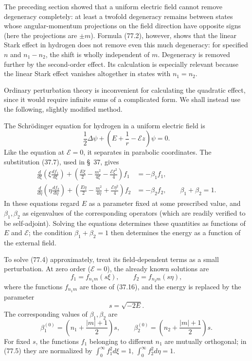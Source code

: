 The preceding section showed that a uniform electric field cannot remove degeneracy completely: at least a twofold degeneracy remains between states whose angular-momentum projections on the field direction have opposite signs (here the projections are $\pm m$). Formula (77.2), however, shows that the linear Stark effect in hydrogen does not remove even this much degeneracy: for specified $n$ and $n_1-n_2$, the shift is wholly independent of $m$. Degeneracy is removed further by the second-order effect. Its calculation is especially relevant because the linear Stark effect vanishes altogether in states with $n_1=n_2$.

Ordinary perturbation theory is inconvenient for calculating the quadratic effect, since it would require infinite sums of a complicated form. We shall instead use the following, slightly modified method.

The Schrödinger equation for hydrogen in a uniform electric field is
\[
 \frac12\Delta\psi+\left(E+\frac1r-\mathcal Ez\right)\psi=0.
\]
Like the equation at $\mathcal E=0$, it separates in parabolic coordinates. The substitution (37.7), used in \S~37, gives
\begin{align}
 \frac d{d\xi}\left(\xi\frac{df_1}{d\xi}\right)+\left(\frac{E\xi}{2}-\frac{m^2}{4\xi}-\frac{\mathcal E\xi^2}{4}\right)f_1&=-\beta_1f_1,\nonumber\\
 \frac d{d\eta}\left(\eta\frac{df_2}{d\eta}\right)+\left(\frac{E\eta}{2}-\frac{m^2}{4\eta}+\frac{\mathcal E\eta^2}{4}\right)f_2&=-\beta_2f_2,\qquad \beta_1+\beta_2=1.
 \tag{77.4}
\end{align}
In these equations regard $E$ as a parameter fixed at some prescribed value, and $\beta_1,\beta_2$ as eigenvalues of the corresponding operators (which are readily verified to be self-adjoint). Solving the equations determines these quantities as functions of $E$ and $\mathcal E$; the condition $\beta_1+\beta_2=1$ then determines the energy as a function of the external field.

To solve (77.4) approximately, treat its field-dependent terms as a small perturbation. At zero order ($\mathcal E=0$), the already known solutions are
\begin{equation}
 f_1=f_{n_1m}(s\xi),\qquad f_2=f_{n_2m}(s\eta),
 \tag{77.5}
\end{equation}
where the functions $f_{n_1m}$ are those of (37.16), and the energy is replaced by the parameter
\begin{equation}
 s=\sqrt{-2E}.
 \tag{77.6}
\end{equation}
The corresponding values of $\beta_1,\beta_2$ are
\begin{equation}
 \beta_1^{(0)}=\left(n_1+\frac{|m|+1}{2}\right)s,\qquad
 \beta_2^{(0)}=\left(n_2+\frac{|m|+1}{2}\right)s.
 \tag{77.7}
\end{equation}
For fixed $s$, the functions $f_1$ belonging to different $n_1$ are mutually orthogonal; in (77.5) they are normalized by $\int_0^\infty f_1^2d\xi=1$, $\int_0^\infty f_2^2d\eta=1$.

